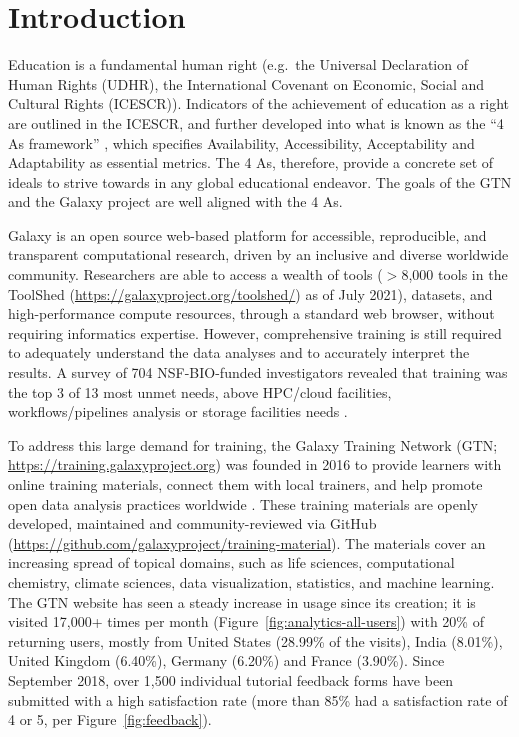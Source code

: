 \documentclass[10pt,letterpaper]{article}
\begin{document}

\section*{Introduction}

Education is a fundamental human right (e.g.\ the Universal Declaration of Human Rights (UDHR), the International Covenant on Economic, Social and Cultural Rights (ICESCR)).
Indicators of the achievement of education as a right are outlined in the ICESCR, and further developed into what is known as the “4 As framework” \cite{tomavsevski2001human}, which specifies Availability, Accessibility, Acceptability and Adaptability as essential metrics.
The 4 As, therefore, provide a concrete set of ideals to strive towards in any global educational endeavor.
The goals of the GTN and the Galaxy project are well aligned with the 4 As.

Galaxy \cite{Jalili2020} is an open source web-based platform for accessible, reproducible, and transparent computational research, driven by an inclusive and diverse worldwide community.
Researchers are able to access a wealth of tools ($>$8,000 tools in the ToolShed (\url{https://galaxyproject.org/toolshed/}) as of July 2021), datasets, and high-performance compute resources, through a standard web browser, without requiring informatics expertise. 
However, comprehensive training is still required to adequately understand the data analyses and to accurately interpret the results. A survey of 704 NSF-BIO-funded investigators revealed that training was the top 3 of 13 most unmet needs, above HPC/cloud facilities, workflows/pipelines analysis or storage facilities needs \cite{Barone2017}.

To address this large demand for training, the Galaxy Training Network (GTN; \url{https://training.galaxyproject.org}) was founded in 2016 to provide learners with online training materials, connect them with local trainers, and help promote open data analysis practices worldwide \cite{Batut2018}. These training materials are openly developed, maintained and community-reviewed via GitHub (\url{https://github.com/galaxyproject/training-material}). 
The materials cover an increasing spread of topical domains, such as life sciences, computational chemistry, climate sciences, data visualization, statistics, and machine learning. 
The GTN website has seen a steady increase in usage since its creation; it is visited 17,000+ times per month (Figure~\ref{fig:analytics-all-users}) with 20\% of returning users, mostly from United States (28.99\% of the visits), India (8.01\%), United Kingdom (6.40\%), Germany (6.20\%) and France (3.90\%). Since September 2018, over 1,500 individual tutorial feedback forms have been submitted with a high satisfaction rate (more than 85\% had a satisfaction rate of 4 or 5, per Figure~\ref{fig:feedback}). 
\end{document}
